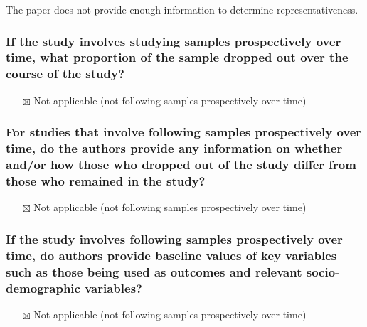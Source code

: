 \documentclass[
  doc, a4paper]{apa7}
\providecommand{\tightlist}{%
  \setlength{\itemsep}{0pt}\setlength{\parskip}{0pt}}
\begin{document}
The paper does not provide enough information to determine representativeness.

\subsubsection{If the study involves studying samples prospectively over time, what proportion of the sample dropped out over the course of the study?}\label{if-the-study-involves-studying-samples-prospectively-over-time-what-proportion-of-the-sample-dropped-out-over-the-course-of-the-study}

\begin{itemize}
\tightlist
\item[$\boxtimes$]
  Not applicable (not following samples prospectively over time)
\end{itemize}

\subsubsection{For studies that involve following samples prospectively over time, do the authors provide any information on whether and/or how those who dropped out of the study differ from those who remained in the study?}\label{for-studies-that-involve-following-samples-prospectively-over-time-do-the-authors-provide-any-information-on-whether-andor-how-those-who-dropped-out-of-the-study-differ-from-those-who-remained-in-the-study}

\begin{itemize}
\tightlist
\item[$\boxtimes$]
  Not applicable (not following samples prospectively over time)
\end{itemize}

\subsubsection{If the study involves following samples prospectively over time, do authors provide baseline values of key variables such as those being used as outcomes and relevant socio-demographic variables?}\label{if-the-study-involves-following-samples-prospectively-over-time-do-authors-provide-baseline-values-of-key-variables-such-as-those-being-used-as-outcomes-and-relevant-socio-demographic-variables}

\begin{itemize}
\tightlist
\item[$\boxtimes$]
  Not applicable (not following samples prospectively over time)
\end{itemize}
\end{document}

